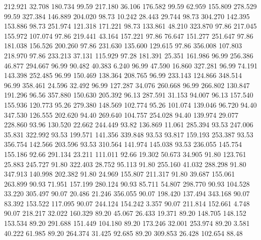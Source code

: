  212.921   32.708  180.734        99.59
 217.180   36.106  176.582        99.59
  62.959  155.809  278.529        99.59
 327.384  146.889  204.020        98.73
  10.242   28.443   29.744        98.73
 304.270  142.395  153.886        98.73
 251.974  121.318  171.221        98.73
 133.861   48.210  323.870        97.86
 217.045  155.972  107.074        97.86
 219.441   43.164  157.221        97.86
  76.647  151.277  251.647        97.86
 181.038  156.526  200.260        97.86
 231.630  135.600  129.615        97.86
 356.008  107.803  218.970        97.86
 233.213   37.131  115.929        97.28
 181.391   25.351  161.986        96.99
 256.386   46.877  294.667        96.99
  90.482   40.383    6.240        96.99
  47.590   16.860  327.281        96.99
  74.191  143.398  252.485        96.99
 150.469  138.364  208.765        96.99
 233.143  124.866  348.514        96.99
 358.461   24.596   32.492        96.99
 127.287   34.076  260.668        96.99
 266.802  130.847  191.296        96.56
 357.880  150.630  205.392        96.13
 287.591   31.153   94.007        96.13
 157.540  155.936  120.773        95.26
 279.380  148.569  102.774        95.26
 101.074  139.046   96.720        94.40
 347.530  126.555  202.620        94.40
 269.640  104.757  254.028        94.40
 139.974   29.077  228.860        93.96
 130.520   22.662  244.449        93.82
 136.869   11.061  285.394        93.53
 247.006   35.831  322.992        93.53
 199.571  141.356  339.848        93.53
  93.817  159.193  253.387        93.53
 356.754  142.566  203.596        93.53
 310.564  141.974  145.038        93.53
 236.055  145.754  155.186        92.66
 291.134   23.211  111.011        92.66
  19.302   50.673   34.905        91.80
 123.761   25.883  245.727        91.80
 322.403   28.752   95.113        91.80
 255.160   41.032  288.298        91.80
 347.913  140.998  202.382        91.80
  24.969  155.807  211.317        91.80
  39.687  155.061  263.899        90.93
  71.951  157.199  280.124        90.93
  85.711   54.807  298.770        90.93
 104.528   33.220  305.497        90.07
  20.486   21.246  356.055        90.07
 198.420  137.494  343.168        90.07
  83.392  153.522  117.095        90.07
 244.124  154.242    3.357        90.07
 211.814  152.661    4.748        90.07
 218.217   32.022  160.329        89.20
  45.067   26.433   19.371        89.20
 148.705  148.152  153.534        89.20
 291.688  151.449  104.180        89.20
 173.246   32.001  253.974        89.20
   3.581   40.222   61.985        89.20
 264.374   31.425   92.685        89.20
 309.853   26.428  102.654        88.48
